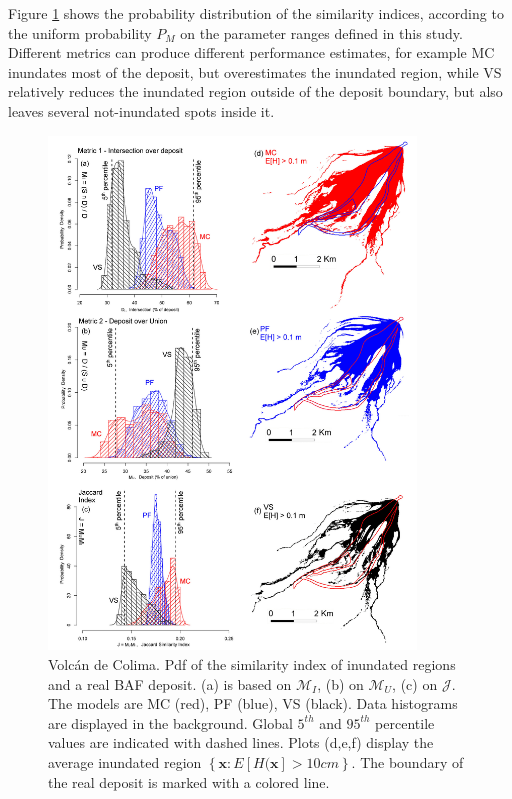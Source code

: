 \documentclass{article}
\begin{document}
Figure \ref{fig:Colima-Hist} shows the probability distribution of the similarity indices, according to the uniform probability $P_M$ on the parameter ranges defined in this study. Different metrics can produce different performance estimates, for example MC inundates most of the deposit, but overestimates the inundated region, while VS relatively reduces the inundated region outside of the deposit boundary, but also leaves several not-inundated spots inside it.
\begin{figure}[H]
         \centering
        \includegraphics[width=0.87\textwidth]{Figures/Histograms.jpg}
        \caption{Volc{\'a}n de Colima. Pdf of the similarity index of inundated regions and a real BAF deposit. (a) is based on $\mathcal M_I$, (b) on $\mathcal M_U$, (c) on $\mathcal J$. The models are MC (red), PF (blue), VS (black). Data histograms are displayed in the background. Global $5^{th}$ and $95^{th}$ percentile values are indicated with dashed lines. Plots (d,e,f) display the average inundated region $\left\{\textbf{x} : E[H(\textbf{x}]>10 cm\right\}$. The boundary of the real deposit is marked with a colored line.}\label{fig:Colima-Hist}
\end{figure}
\end{document}
